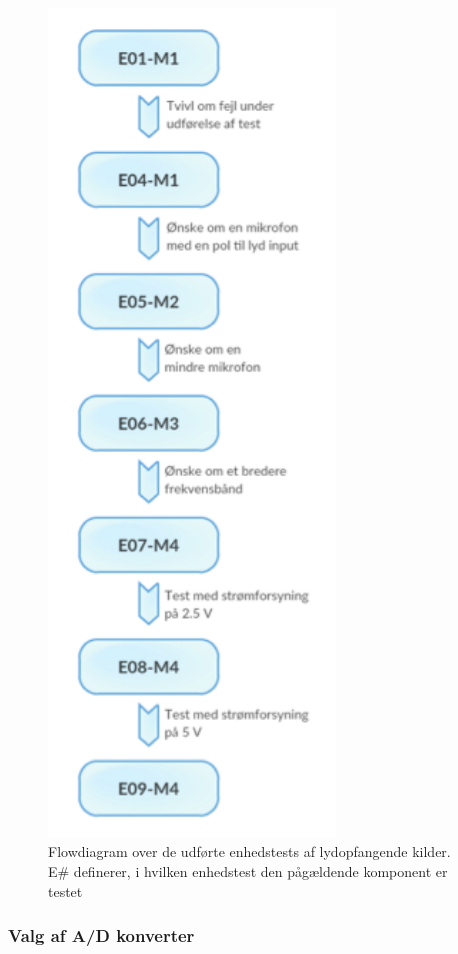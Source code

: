 \begin{figure}[htb]
\centering
\includegraphics[width=3in]{flowdiagrameop.png}
\caption{Flowdiagram over de udførte enhedstests af lydopfangende kilder. E\# definerer, i hvilken enhedstest den pågældende komponent er testet}
\label{fig:flowop}
\end{figure}
\subsubsection{Valg af A/D konverter}

